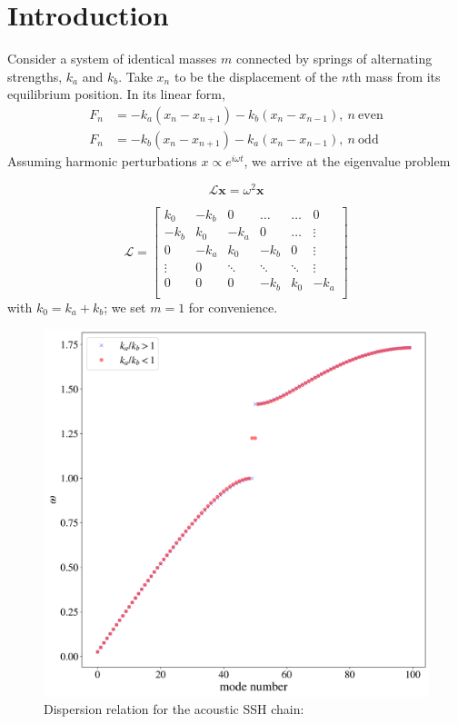 \documentclass[%
 amsmath,amssymb,
 aps,
 prl,
 twocolumn,
]{revtex4-2}
\begin{document}
\section{\label{sec:intro}Introduction}
Consider a system of identical masses $m$ connected by springs of alternating strengths, $k_a$ and $k_b$. Take $x_n$ to be the displacement of the $n$th mass from its equilibrium position. In its linear form,
\begin{align}
    F_n &= -k_a (x_n - x_{n+1}) - k_b (x_n - x_{n-1}),\ n\ \mathrm{even}\\
    F_n &= -k_b (x_n - x_{n+1}) - k_a (x_n - x_{n-1}),\ n\ \mathrm{odd}  
    \label{eq:chain_force}    
\end{align}
Assuming harmonic perturbations $x \propto e^{i\omega t}$, we arrive at the eigenvalue problem 

$$
\mathcal{L} \mathbf{x} = \omega^2 \mathbf{x}
$$

$$
\mathcal{L} = \begin{bmatrix}
k_0 & -k_b & 0 & \dots & \dots &0 \\
-k_b & k_0 & -k_a & 0 & \dots & \vdots \\
0 & -k_a & k_0 & -k_b & 0 & \vdots\\
\vdots & 0  & \ddots & \ddots & \ddots &\vdots\\
0 & 0 & 0 & -k_b & k_0 & -k_a \\
\end{bmatrix}
$$
with $k_0 = k_a + k_b$; we set $m = 1$ for convenience. 
\begin{figure}
    \centering
    \includegraphics[width=\columnwidth]{ssh_fput_linear_modes.png}
    \caption{Dispersion relation for the acoustic SSH chain: }
    \label{fig:linear_modes}
\end{figure}
\end{document}
